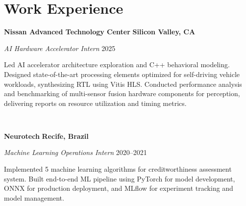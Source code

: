 \documentclass[letterpaper,10pt]{article}
\newcommand{\we}[5]{

\begin{minipage}[t]{.15\textwidth}
\end{minipage}
\hfill\vline\hfill 
\begin{minipage}[t]{0.95\textwidth}
#2 \hfill \textbf{#5}

\textit{#3} \hfill \textsc{#1}

\footnotesize{#4}
\end{minipage}\\\vspace{.25cm}}
\begin{document}
\section{Work Experience}
\vspace*{.1cm}
\we{2025}{\textbf{Nissan Advanced Technology Center}}{AI Hardware Accelerator Intern}{
	Led AI accelerator architecture exploration and C++ behavioral modeling. Designed state-of-the-art processing elements optimized for self-driving vehicle workloads, synthesizing RTL using Vitis HLS. Conducted performance analysis and benchmarking of multi-sensor fusion hardware components for perception, delivering reports on resource utilization and timing metrics.
	}{Silicon Valley, CA}
\we{2020--2021}{\textbf{Neurotech}}{Machine Learning Operations Intern}{
	Implemented 5 machine learning algorithms for creditworthiness assessment system. Built end-to-end ML pipeline using PyTorch for model development, ONNX for production deployment, and MLflow for experiment tracking and model management.
	}{Recife, Brazil}
\vspace*{-.25cm}
\end{document}
